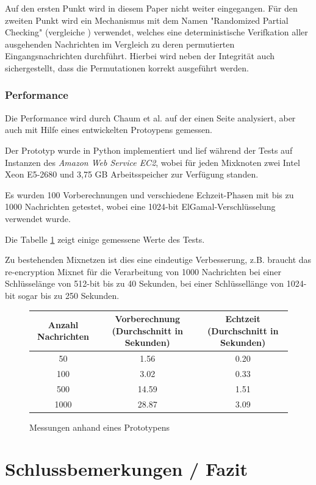 \documentclass[
    fontsize=12pt,
    headings=small,
    parskip=half,           %
    bibliography=totoc,
    numbers=noenddot,       %
    open=any,               %
    ]{scrreprt}
\begin{document}
Auf den ersten Punkt wird in diesem Paper nicht weiter eingegangen.
Für den zweiten Punkt wird ein Mechanismus mit dem Namen "Randomized Partial Checking" (vergleiche \cite{jakobsson2002making}) verwendet, welches eine deterministische Verifkation aller ausgehenden Nachrichten im Vergleich zu deren permutierten Eingangsnachrichten durchführt. 
Hierbei wird neben der Integrität auch sichergestellt, dass die Permutationen korrekt ausgeführt werden.


\subsection{Performance}

Die Performance wird durch Chaum et al. auf der einen Seite analysiert, aber auch mit Hilfe eines entwickelten Protoypens gemessen.

Der Prototyp wurde in Python implementiert und lief während der Tests auf Instanzen des \textit{Amazon Web Service EC2}, wobei für jeden Mixknoten zwei Intel Xeon E5-2680 und 3,75 GB Arbeitsspeicher zur Verfügung standen.

Es wurden 100 Vorberechnungen und verschiedene Echzeit-Phasen mit bis zu 1000 Nachrichten getestet, wobei eine 1024-bit ElGamal-Verschlüsselung verwendet wurde.

Die Tabelle \ref{fig:messung} zeigt einige gemessene Werte des Tests.

Zu bestehenden Mixnetzen ist dies eine eindeutige Verbesserung,
z.B. braucht das re-encryption Mixnet für die Verarbeitung von 1000 Nachrichten bei einer Schlüsselänge von 512-bit bis zu 40 Sekunden, bei einer Schlüssellänge von 1024-bit sogar bis zu 250 Sekunden.\cite{ribarski2012mixnets}



\begin{figure}

\begin{tabular}{c|c|c}

Anzahl Nachrichten & Vorberechnung (Durchschnitt in Sekunden) & Echtzeit (Durchschnitt in Sekunden) \\ 
\hline 
50 & 1.56 & 0.20 \\ 
\hline 
100 & 3.02 & 0.33 \\ 
\hline 
500 & 14.59 & 1.51 \\ 
\hline 
1000 & 28.87 & 3.09 \\ 

\end{tabular} 
\caption{Messungen anhand eines Prototypens} \label{fig:messung} 
\end{figure}






\chapter{Schlussbemerkungen / Fazit}




\end{document}
